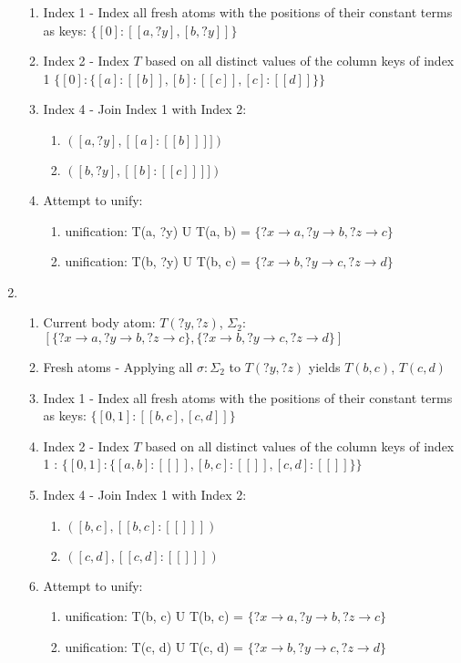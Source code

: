 \documentclass[sigconf,screen,review=false,natbib]{acmart}
\theoremstyle{definition}
\begin{document}
\begin{enumerate}
\begin{enumerate}
		      \item Index 1 - Index all fresh atoms with the positions of their constant terms as keys: $\{[0] : [[a, ?y], [b, ?y]]\}$
		      \item Index 2 - Index $T$ based on all distinct values of the column keys of index 1  $\{[0]: \{[a]: [[b]], [b]: [[c]], [c]: [[d]]\}\}$
		      \item Index 4 - Join Index 1 with Index 2:
		            \begin{enumerate}
			            \item $([a, ?y], [[a] : [[b]]]])$
			            \item $([b, ?y], [[b] : [[c]]]])$
		            \end{enumerate}
		      \item Attempt to unify:
		            \begin{enumerate}
			            \item unification: T(a, ?y) U T(a, b) = $\{?x \rightarrow a, ?y \rightarrow b, ?z \rightarrow c\}$
			            \item unification: T(b, ?y) U T(b, c) = $\{?x \rightarrow b, ?y \rightarrow c, ?z \rightarrow d\}$
		            \end{enumerate}
	      \end{enumerate}
	\item \begin{enumerate}
		      \item Current body atom: $T(?y, ?z)$, $\Sigma_2$: $[\{?x \rightarrow a, ?y \rightarrow b, ?z \rightarrow c\}, \{?x \rightarrow b, ?y \rightarrow c, ?z \rightarrow d\}]$
		      \item Fresh atoms - Applying all $\sigma : \Sigma_2$ to $T(?y, ?z)$ yields $T(b, c)$, $T(c, d)$
		      \item Index 1 - Index all fresh atoms with the positions of their constant terms as keys: $\{[0, 1] : [[b, c], [c, d]]\}$
		      \item Index 2 - Index $T$ based on all distinct values of the column keys of index 1 : $\{[0, 1]: \{[a, b]: [[]], [b, c]: [[]], [c, d]: [[]]\}\}$
		      \item Index 4 - Join Index 1 with Index 2:
		            \begin{enumerate}
			            \item $([b, c], [[b, c]: [[]]])$
			            \item $([c, d], [[c, d]: [[]]])$
		            \end{enumerate}
		      \item Attempt to unify:
		            \begin{enumerate}
			            \item unification: T(b, c) U T(b, c) = $\{?x \rightarrow a, ?y \rightarrow b, ?z \rightarrow c\}$
			            \item unification: T(c, d) U T(c, d) = $\{?x \rightarrow b, ?y \rightarrow c, ?z \rightarrow d\}$
		            \end{enumerate}
	      \end{enumerate}
\end{enumerate}
\end{document}
